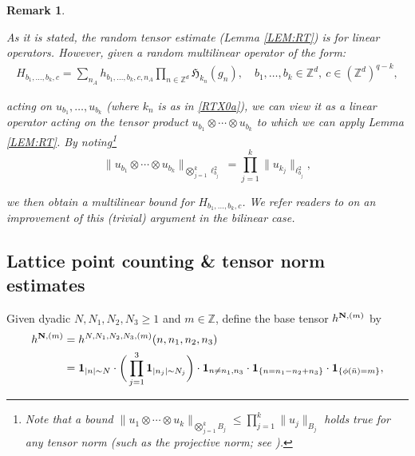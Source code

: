 \documentclass[%
11pt,  reqno]{amsart}
\newtheorem{remark}[theorem]{Remark}
\newcommand{\1}{\hspace{0.2mm}\text{I}\hspace{0.2mm}}
\newcommand{\noi}{\noindent}
\newcommand{\Z}{\mathbb{Z}}
\renewcommand{\l}{\ell}
\newcommand{\ind}{\mathbf 1}
\numberwithin{equation}{section}
\numberwithin{theorem}{section}
\newcommand{\Hf}{\mathfrak{H}}
\begin{document}
\begin{remark}\label{REM:tensor}\rm


As it is stated, the random tensor estimate (Lemma \ref{LEM:RT})
is  for linear operators.
However, given a random multilinear operator of the form: %
\begin{align*}
H_{b_1, \dots, b_k, c}
= 
\sum_{n_A} h_{b_1, \dots, b_k,c, n_A} 
\prod_{n \in \Z^d} 
\Hf_{k_n}(g_{n}), 
\quad 
b_1, \dots, b_k \in \Z^d, \  c \in (\Z^d)^{q-k}, 
\end{align*}

\noi
acting on $u_{b_1}, \dots, u_{b_k}$
(where $k_n$ is as in \eqref{RTX0a}), 
we can view it as a linear operator
acting on the tensor product 
$u_{b_1}\otimes \cdots \otimes u_{b_k}$
to which 
we can apply Lemma \ref{LEM:RT}.
By noting\footnote{Note that 
a bound
$\|u_1\otimes \cdots \otimes u_k\|_{\bigotimes_{j = 1}^k B_j}
\le  \prod_{j = 1}^k \|u_{j}\|_{B_j}$
holds true for any tensor norm (such 
as the projective norm; see \cite[Section 2.1 and Chapter 6]{Ryan}).
}
\[
\|u_{b_1}\otimes \cdots \otimes u_{b_k}\|_{\bigotimes_{j = 1}^k \l^2_{b_j}}
= \prod_{j = 1}^k \|u_{k_j}\|_{\l^2_{b_j}}, 
\]


\noi
we then obtain a multilinear bound
for $H_{b_1, \dots, b_k, c}$.
We refer readers to 
\cite[Lemma 8.1]{BDNY}
on an improvement of this (trivial) argument
in the bilinear case.

\end{remark}





\subsection{Lattice point counting \& tensor norm estimates}

Given dyadic $N, N_1, N_2, N_3\ge 1$ and $m \in \Z$, 
define the base tensor $h^{{\bf N}, (m)}$ by 
\begin{align}
\label{baseT}
\begin{split}
h^{{\bf N}, (m)} &  = h^{N, N_1, N_2, N_3, (m)} (n,n_1,n_2,n_3) \\
& = \ind_{|n| \sim N}  \cdot 
\bigg( \prod_{j=1}^3 \ind_{|n_j|\sim N_j}  \bigg) \cdot \ind_{n \neq n_1,n_3} \cdot \ind_{\{n = n_1-n_2+n_3\}}  
\cdot  \ind_{\{\phi(\bar n) = m\}}, 
\end{split}
\end{align}
\end{document}
